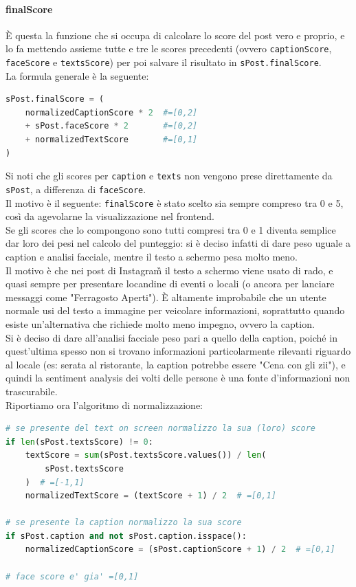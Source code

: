 \paragraph{finalScore} \aCapo
È questa la funzione che si occupa di calcolare lo score del post vero e proprio, e lo fa
mettendo assieme tutte e tre le scores precedenti (ovvero \verb+captionScore+, \verb+faceScore+ e \verb+textsScore+)
per poi salvare il risultato in \verb+sPost.finalScore+.\\
La formula generale è la seguente:
\begin{lstlisting}[language=Python]
sPost.finalScore = (
    normalizedCaptionScore * 2  #=[0,2]
    + sPost.faceScore * 2       #=[0,2]
    + normalizedTextScore       #=[0,1]
)
\end{lstlisting}
Si noti che gli scores per \verb+caption+ e \verb+texts+ non vengono prese direttamente da \verb+sPost+, a differenza
di \verb+faceScore+. \\
Il motivo è il seguente: \verb+finalScore+ è stato scelto sia sempre compreso tra 0 e 5,
così da agevolarne la visualizzazione nel frontend. \\
Se gli scores che lo compongono sono tutti
compresi tra 0 e 1 diventa semplice dar loro dei pesi nel calcolo del punteggio: si è deciso
infatti di dare peso uguale a caption e analisi facciale, mentre il testo a schermo pesa molto meno.\\
Il motivo è che nei post di Instagram\G{} il testo a schermo viene usato di rado, e quasi sempre
per presentare locandine di eventi o locali (o ancora per lanciare messaggi come "Ferragosto Aperti").
È altamente improbabile che un utente normale usi del testo a immagine per veicolare informazioni,
soprattutto quando esiste un'alternativa che richiede molto meno impegno, ovvero la caption.\\
Si è deciso di dare all'analisi facciale peso pari a quello della caption, poiché in quest'ultima spesso
non si trovano informazioni particolarmente rilevanti riguardo al locale (es: serata al ristorante,
la caption potrebbe essere "Cena con gli zii"), e quindi la sentiment analysis dei volti delle persone 
è una fonte d'informazioni non trascurabile.\\
Riportiamo ora l'algoritmo di normalizzazione:
\begin{lstlisting}[language=Python]
# se presente del text on screen normalizzo la sua (loro) score
if len(sPost.textsScore) != 0:
    textScore = sum(sPost.textsScore.values()) / len(
        sPost.textsScore
    )  # =[-1,1]
    normalizedTextScore = (textScore + 1) / 2  # =[0,1]

# se presente la caption normalizzo la sua score
if sPost.caption and not sPost.caption.isspace():
    normalizedCaptionScore = (sPost.captionScore + 1) / 2  # =[0,1]

# face score e' gia' =[0,1]
\end{lstlisting}
